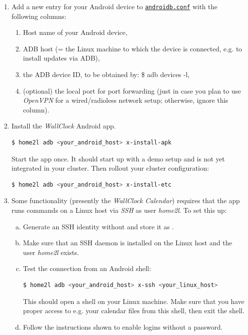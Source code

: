 \documentclass[12pt,english,parskip=half,headheight=19pt]{scrreprt}
\newcommand{\lstf}[1]{\colorbox{lstbackground}{\ttfamily\footnotesize#1}}
\newcommand{\idx}[1]{#1\index{#1}}
\newcommand{\reftool}[1]{\hyperref[tool:#1]{\texttt{\idx{#1}}}}
\begin{document}
\begin{enumerate}
  \item Add a new entry for your Android device to \reftool{androidb.conf} with the following columns:
    \begin{enumerate}
      \item Host name of your Android device,
      \item ADB host (= the Linux machine to which the device is connected, e.g. to install updates via ADB),
      \item the ADB device ID, to be obtained by: \lstf{\$ adb devices -l},
      \item (optional) the local port for port forwarding (just in case you plan to use \textit{OpenVPN} for a wired/radioless network setup; otherwise, ignore this column).
    \end{enumerate}

  \item Install the \textit{WallClock} Android app.
    \begin{lstlisting}[language=bash]
      $ home2l adb <your_android_host> x-install-apk
    \end{lstlisting}
    Start the app once. It should start up with a demo setup and is not yet integrated in your cluster.
    Then rollout your cluster configuration:
    \begin{lstlisting}[language=bash]
      $ home2l adb <your_android_host> x-install-etc
    \end{lstlisting}

  \item Some functionality (presently the \textit{WallClock Calendar}) requires that the app runs commands on a Linux host via \textit{SSH} as user \textit{home2l}. To set this up:
    \begin{enumerate}[a)]
      \item Generate an SSH identity without and store it as
            .
      \item Make sure that an SSH daemon is installed on the Linux host and the user \textit{home2l} exists.
      \item Test the connection from an Android shell:
        \begin{lstlisting}[language=bash]
          $ home2l adb <your_android_host> x-ssh <your_linux_host>
        \end{lstlisting}
        This should open a shell on your Linux machine. Make sure that you have proper access
        to e.g. your calendar files from this shell, then exit the shell.
      \item Follow the instructions shown to enable logins without a password.
    \end{enumerate}
\end{enumerate}
\end{document}
